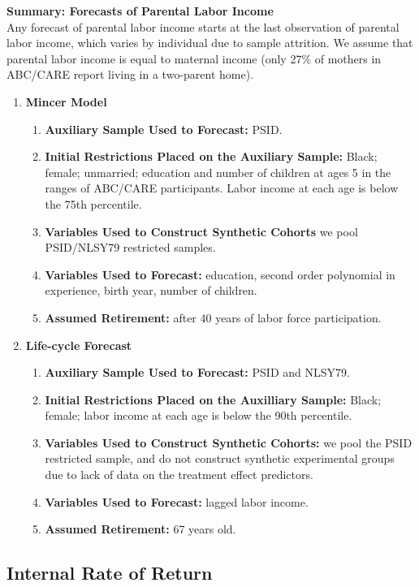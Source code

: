 \noindent \textbf{Summary: Forecasts of Parental Labor Income}\\
\noindent Any forecast of parental labor income starts at the last observation of parental labor income, which varies by individual due to sample attrition. We assume that parental labor income is equal to maternal income (only 27\% of mothers in ABC/CARE report living in a two-parent home).
\begin{enumerate}
\item \textbf{Mincer Model}
\begin{enumerate}
\item \textbf{Auxiliary Sample Used to Forecast:} PSID.
\item \textbf{Initial Restrictions Placed on the Auxiliary Sample:} Black; female; unmarried; education and number of children at ages 5 in the ranges of ABC/CARE participants. Labor income at each age is below the 75th percentile.
\item \textbf{Variables Used to Construct Synthetic Cohorts} we pool PSID/NLSY79 restricted samples.
\item \textbf{Variables Used to Forecast:} education, second order polynomial in experience, birth year, number of children.
\item \textbf{Assumed Retirement:} after 40 years of labor force participation.
\end{enumerate}
\item \textbf{Life-cycle Forecast}
\begin{enumerate}
\item \textbf{Auxiliary Sample Used to Forecast:} PSID and NLSY79.
\item \textbf{Initial Restrictions Placed on the Auxilliary Sample:} Black; female; labor income at each age is below the 90th percentile.
\item \textbf{Variables Used to Construct Synthetic Cohorts:} we pool the PSID restricted sample, and do not construct synthetic experimental groups due to lack of data on the treatment effect predictors.
\item \textbf{Variables Used to Forecast:} lagged labor income.
\item \textbf{Assumed Retirement:} 67 years old.
\end{enumerate}
\end{enumerate}

\subsection{Internal Rate of Return}
\label{app:method_irr}

